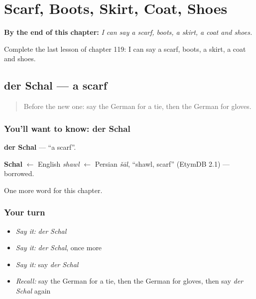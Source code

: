
\chapter{Scarf, Boots, Skirt, Coat, Shoes}
\label{ch:ge-scarf-boots-skirt-coat-shoes}

\begin{chapteropening}
\textbf{By the end of this chapter:} \emph{I can say a scarf, boots, a skirt, a coat and shoes.}

Complete the last lesson of chapter 119: I can say a scarf, boots, a skirt, a coat and shoes.
\end{chapteropening}

\section[der Schal]{der Schal — a scarf}

\label{lesson:GE-C119-schal}



\begin{quote}
Before the new one: say the German for a tie, then the German for gloves.
\end{quote}

\subsection*{You'll want to know: der Schal}
\textbf{der Schal} — \textquotedblleft{}a scarf\textquotedblright{}.

\begin{cousinweb}
\textbf{Schal} $\leftarrow$ English \emph{shawl} $\leftarrow$ Persian \emph{šāl}, \textquotedblleft{}shawl, scarf\textquotedblright{} (EtymDB 2.1) — borrowed.
\end{cousinweb}

\begin{grammarlens}[title={What you've built}]
One more word for this chapter.
\end{grammarlens}

\subsection*{Your turn}
\begin{itemize}
\raggedright
  \item \emph{Say it:} \emph{der Schal}
  \item \emph{Say it:} \emph{der Schal}, once more
  \item \emph{Say it:} say \emph{der Schal}
  \item \emph{Recall:} say the German for a tie, then the German for gloves, then say \emph{der Schal} again
\end{itemize}

